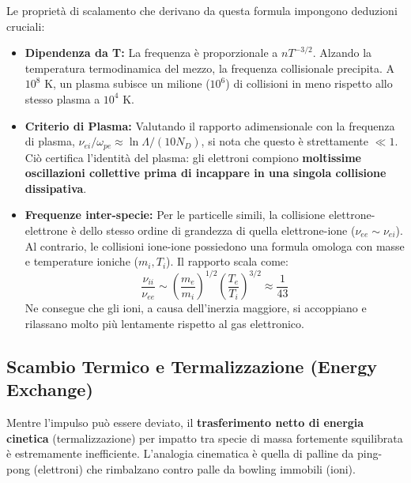 Le proprietà di scalamento che derivano da questa formula impongono deduzioni cruciali:
\begin{itemize}
\item \textbf{Dipendenza da T:} La frequenza è proporzionale a $n T^{-3/2}$. Alzando la temperatura termodinamica del mezzo, la frequenza collisionale precipita. A $10^8 \text{ K}$, un plasma subisce un milione ($10^6$) di collisioni in meno rispetto allo stesso plasma a $10^4 \text{ K}$.
\item \textbf{Criterio di Plasma:} Valutando il rapporto adimensionale con la frequenza di plasma, $\nu_{ei} / \omega_{pe} \approx \ln \Lambda / (10 N_D)$, si nota che questo è strettamente $\ll 1$. Ciò certifica l'identità del plasma: gli elettroni compiono \textbf{moltissime oscillazioni collettive prima di incappare in una singola collisione dissipativa}.
\item \textbf{Frequenze inter-specie:} Per le particelle simili, la collisione elettrone-elettrone è dello stesso ordine di grandezza di quella elettrone-ione ($\nu_{ee} \sim \nu_{ei}$). Al contrario, le collisioni ione-ione possiedono una formula omologa con masse e temperature ioniche ($m_i, T_i$). Il rapporto scala come:
\begin{equation}
\frac{\nu_{ii}}{\nu_{ee}} \sim \left(\frac{m_e}{m_i}\right)^{1/2} \left(\frac{T_e}{T_i}\right)^{3/2} \approx \frac{1}{43}
\end{equation}
Ne consegue che gli ioni, a causa dell'inerzia maggiore, si accoppiano e rilassano molto più lentamente rispetto al gas elettronico.
\end{itemize}

\subsection{Scambio Termico e Termalizzazione (Energy Exchange)}
Mentre l'impulso può essere deviato, il \textbf{trasferimento netto di energia cinetica} (termalizzazione) per impatto tra specie di massa fortemente squilibrata è estremamente inefficiente. L'analogia cinematica è quella di palline da ping-pong (elettroni) che rimbalzano contro palle da bowling immobili (ioni).

